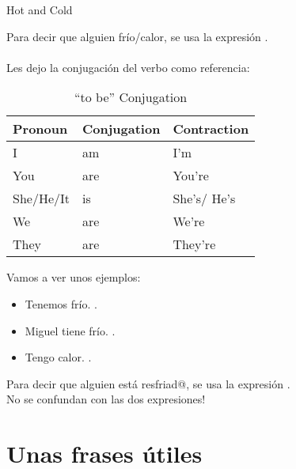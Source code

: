 \begin{conf}{Hot and Cold}

Para decir que alguien  fr\'io/calor, se usa la
expresi\'on .\\ \\

Les dejo la conjugaci\'on del verbo  como referencia:\\

\begin{table}[H]
	\centering
	\begin{tabular}{lll}
	\toprule
		\textbf{Pronoun} & \textbf{Conjugation} & \textbf{Contraction}\\
	\midrule
		I & am & I'm\\
		You & are & You're \\
		She/He/It & is & She's/ He's\\
		We & are & We're \\
		They & are & They're \\
	\bottomrule
	\end{tabular}
	\caption{``to be'' Conjugation}
\end{table}

Vamos a ver unos ejemplos:
	\begin{itemize}
		\item Tenemos fr\'io. \arr {}.
		\item Miguel tiene fr\'io. \arr {}.
		\item Tengo calor. \arr {}.
	\end{itemize}

Para decir que alguien est\'a resfriad@, se usa la expresi\'on
.\\

\textexclamdown No se confundan con las dos expresiones!
\end{conf}

\section{Unas frases \'utiles}

